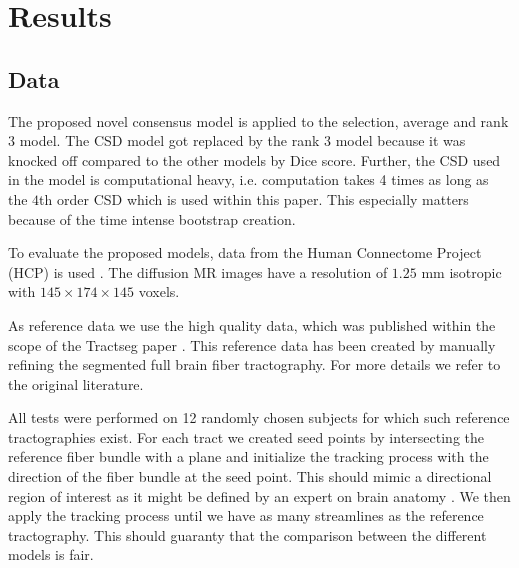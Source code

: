 \section{Results}
\subsection{Data}
The proposed novel consensus model is applied to the selection,
average and rank $3$ model. The CSD model got replaced by the rank $3$ model
because it was knocked off compared to the other models by Dice score. Further,
the CSD used in the model is computational heavy, i.e. computation takes 4 times as long
as the $4$th order CSD which is used within this paper. This especially matters
because of the time intense bootstrap creation. 

To evaluate the proposed models, data from the Human
Connectome Project (HCP) is used \cite{HCP}. The diffusion MR images have a resolution of $1.25$ mm
isotropic with $145 \times 174 \times 145$ voxels. 

As reference data we use the high quality data, which was published within the
scope of the Tractseg paper \cite{WASSERTHAL2018239}. This reference data has been
created by manually refining the segmented full brain fiber tractography. For
more details we refer to the original literature.

All tests were performed on 12 randomly chosen subjects for which such reference tractographies
exist. For each tract we created seed points by intersecting the reference
fiber bundle with a plane and initialize the tracking process with the direction
of the fiber bundle at the seed point. This should mimic a directional region of
interest as it might be defined by an expert on brain anatomy
\cite{Graumann2016}. We then apply the tracking process until we have as many
streamlines as the reference tractography. This should guaranty that the
comparison between the different models is fair.

